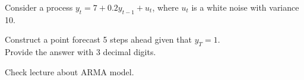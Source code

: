 
\begin{question}
Consider a process \(y_t = 7 + 0.2 y_{t-1}+u_t\), where \(u_t\) is a white noise with variance 10.

Construct a point forecast 5 steps ahead given that \(y_T=1\).\\
Provide the answer with 3 decimal digits.
\end{question}

\begin{solution}
Check lecture about ARMA model.
\end{solution}

